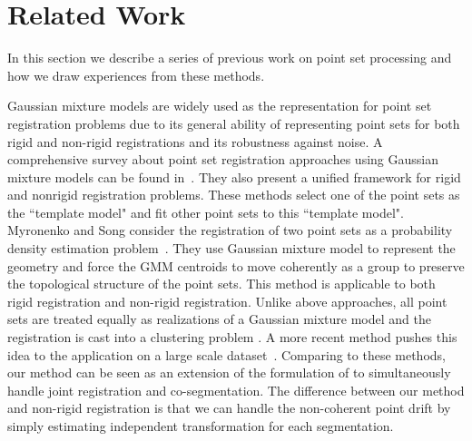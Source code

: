 \section{Related Work}
\label{sec:rw}
In this section we describe a series of previous work on point set processing and how we draw experiences from these methods. 

Gaussian mixture models are widely used as the representation for point set registration problems due to its general ability of representing point sets for both rigid and non-rigid registrations and its robustness against noise.
%
A comprehensive survey about point set registration approaches using Gaussian mixture models can be found in~\cite{GMM_PAMI}. 
They also present a unified framework for rigid and nonrigid registration problems. 
%
These methods select one of the point sets as the ``template model" and fit other point sets to this ``template model".
%
Myronenko and Song consider the registration of two point sets as a probability density estimation problem~\cite{CPD}.
They use Gaussian mixture model to represent the geometry and force the GMM centroids to move coherently as a group to preserve the topological structure of the point sets. 
This method is applicable to both rigid registration and non-rigid registration. 
%
%
Unlike above approaches, all point sets are treated equally as realizations of a Gaussian mixture model and the registration is cast into a clustering problem \cite{Evangelidis2014} . 
A more recent method pushes this idea to the application on a large scale dataset~\cite{GOGMA}. 
Comparing to these methods, our method can be seen as an extension of the formulation of \cite{Evangelidis2014} to simultaneously handle joint registration and co-segmentation. The difference between our method and non-rigid registration is that we can handle the non-coherent point drift by simply estimating independent transformation for each segmentation.
%

